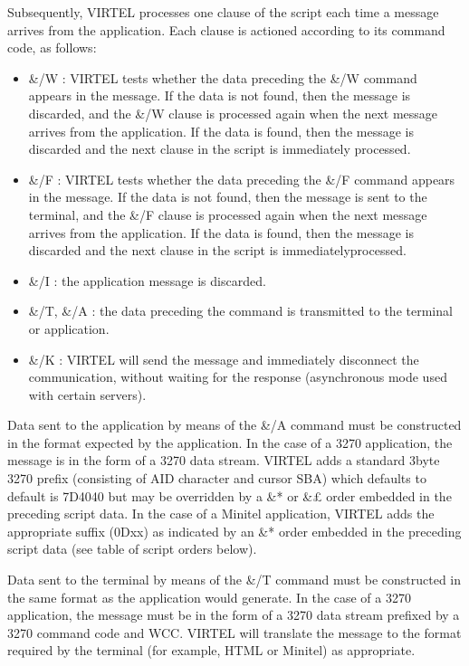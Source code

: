 \documentclass[letterpaper,10pt,english]{sphinxmanual}
\begin{document}
\sphinxAtStartPar
Subsequently, VIRTEL processes one clause of the script each time a message arrives from the application. Each clause is actioned according to its command code, as follows:
\begin{itemize}
\item {} 
\sphinxAtStartPar
\&/W : VIRTEL tests whether the data preceding the \&/W command appears in the message. If the data is not found, then the message is discarded, and the \&/W clause is processed again when the next message arrives from the application. If the data is found, then the message is discarded and the next clause in the script is immediately processed.

\item {} 
\sphinxAtStartPar
\&/F : VIRTEL tests whether the data preceding the \&/F command appears in the message. If the data is not found, then the message is sent to the terminal, and the \&/F clause is processed again when the next message arrives from the application. If the data is found, then the message is discarded and the next clause in the script is immediatelyprocessed.

\item {} 
\sphinxAtStartPar
\&/I : the application message is discarded.

\item {} 
\sphinxAtStartPar
\&/T, \&/A : the data preceding the command is transmitted to the terminal or application.

\item {} 
\sphinxAtStartPar
\&/K : VIRTEL will send the message and immediately disconnect the communication, without waiting for the response (asynchronous mode used with certain servers).

\end{itemize}

\sphinxAtStartPar
Data sent to the application by means of the \&/A command must be constructed in the format expected by the application. In the case of a 3270 application, the message is in the form of a 3270 data stream. VIRTEL adds a standard 3\sphinxhyphen{}byte 3270 prefix (consisting of AID character and cursor SBA) which defaults to default is 7D4040 but may be overridden by a \&* or \&£ order embedded in the preceding script data. In the case of a Minitel application, VIRTEL adds the appropriate suffix (0Dxx) as indicated by an \&* order embedded in the preceding script data (see table of script orders below).

\sphinxAtStartPar
Data sent to the terminal by means of the \&/T command must be constructed in the same format as the application would generate. In the case of a 3270 application, the message must be in the form of a 3270 data stream prefixed by a 3270 command code and WCC. VIRTEL will translate the message to the format required by the terminal (for example, HTML or Minitel) as appropriate.
\end{document}
